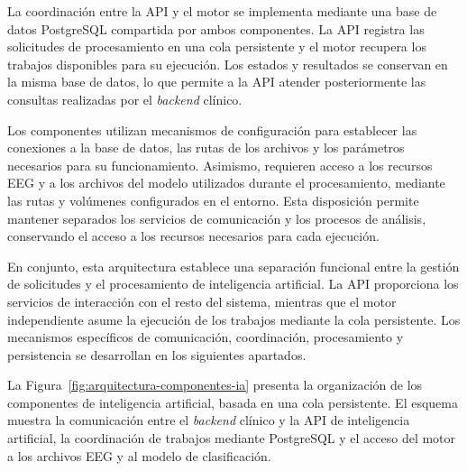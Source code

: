 La coordinación entre la API y el motor se
implementa mediante una base de datos PostgreSQL
compartida por ambos componentes. La API registra las solicitudes de procesamiento
en una cola persistente
y el motor recupera los trabajos disponibles
para su ejecución. Los estados y resultados
se conservan en la misma base de datos, lo que
permite a la API atender posteriormente las
consultas realizadas por el \textit{backend} clínico.


Los componentes utilizan mecanismos de configuración
para establecer las conexiones a la base de datos,
las rutas de los archivos y los parámetros necesarios
para su funcionamiento. Asimismo, requieren acceso
a los recursos EEG y a los archivos del modelo
utilizados durante el procesamiento, mediante
las rutas y volúmenes configurados en el entorno.
Esta disposición permite mantener separados
los servicios de comunicación y los procesos
de análisis, conservando el acceso a los
recursos necesarios para cada ejecución.

En conjunto, esta arquitectura establece una
separación funcional entre la gestión de solicitudes
y el procesamiento de inteligencia artificial.
La API proporciona los servicios de interacción
con el resto del sistema, mientras que el motor
independiente asume la ejecución de los trabajos
mediante la cola persistente. Los mecanismos
específicos de comunicación, coordinación,
procesamiento y persistencia se desarrollan
en los siguientes apartados.


La Figura~\ref{fig:arquitectura-componentes-ia}
presenta la organización de los componentes de
inteligencia artificial, basada en una cola persistente. El esquema muestra
la comunicación entre el \textit{backend} clínico y la API
de inteligencia artificial, la coordinación de
trabajos mediante PostgreSQL y el acceso del motor
a los archivos EEG y al modelo de clasificación.


